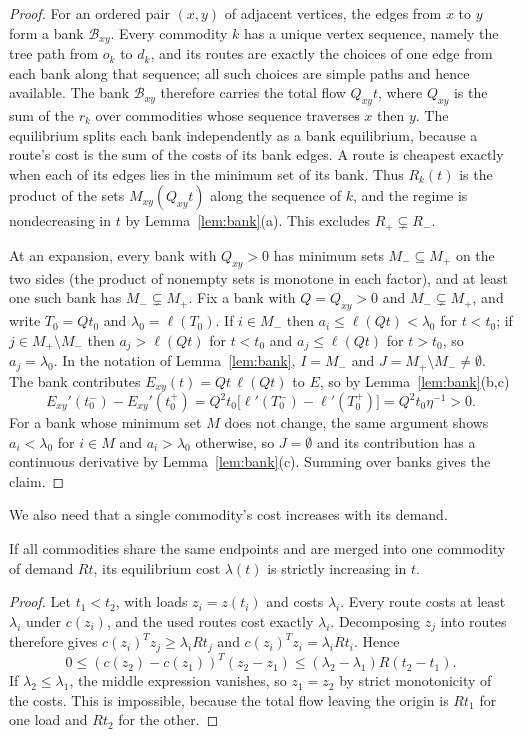 \begin{proof}
For an ordered pair $(x,y)$ of adjacent vertices, the edges from $x$ to $y$
form a bank $\mathcal B_{xy}$. Every commodity $k$ has a unique vertex
sequence, namely the tree path from $o_k$ to $d_k$, and its routes are
exactly the choices of one edge from each bank along that sequence; all such
choices are simple paths and hence available. The bank $\mathcal B_{xy}$
therefore carries the total flow $Q_{xy}t$, where $Q_{xy}$ is the sum of the
$r_k$ over commodities whose sequence traverses $x$ then $y$. The
equilibrium splits each bank independently as a bank equilibrium, because a
route's cost is the sum of the costs of its bank edges. A route is cheapest
exactly when each of its edges lies in the minimum set of its bank. Thus
$R_k(t)$ is the product of the sets $M_{xy}(Q_{xy}t)$ along the sequence of
$k$, and the regime is nondecreasing in $t$ by Lemma~\ref{lem:bank}(a). This
excludes $R_+\subsetneq R_-$.

At an expansion, every bank with $Q_{xy}>0$ has minimum sets $M_-\subseteq
M_+$ on the two sides (the product of nonempty sets is monotone in each
factor), and at least one such bank has $M_-\subsetneq M_+$. Fix a bank with
$Q=Q_{xy}>0$ and $M_-\subsetneq M_+$, and write $T_0=Qt_0$ and
$\lambda_0=\ell(T_0)$. If $i\in M_-$ then $a_i\le\ell(Qt)<\lambda_0$ for
$t<t_0$; if $j\in M_+\setminus M_-$ then $a_j>\ell(Qt)$ for $t<t_0$ and
$a_j\le\ell(Qt)$ for $t>t_0$, so $a_j=\lambda_0$. In the notation of
Lemma~\ref{lem:bank}, $I=M_-$ and $J=M_+\setminus M_-\ne\emptyset$. The bank
contributes $E_{xy}(t)=Qt\,\ell(Qt)$ to $E$, so by Lemma~\ref{lem:bank}(b,c)
\[
 E_{xy}'(t_0^-)-E_{xy}'(t_0^+)=Q^2t_0\bigl[\ell'(T_0^-)-\ell'(T_0^+)\bigr]
 =Q^2t_0\eta^{-1}>0.
\]
For a bank whose minimum set $M$ does not change, the same argument shows
$a_i<\lambda_0$ for $i\in M$ and $a_i>\lambda_0$ otherwise, so $J=\emptyset$
and its contribution has a continuous derivative by
Lemma~\ref{lem:bank}(c). Summing over banks gives the claim.
\end{proof}

We also need that a single commodity's cost increases with its demand.

\begin{lemma}\label{lem:monotone}
If all commodities share the same endpoints and are merged into one
commodity of demand $Rt$, its equilibrium cost $\lambda(t)$ is strictly
increasing in $t$.
\end{lemma}

\begin{proof}
Let $t_1<t_2$, with loads $z_i=z(t_i)$ and costs $\lambda_i$. Every route
costs at least $\lambda_i$ under $c(z_i)$, and the used routes cost exactly
$\lambda_i$. Decomposing $z_j$ into routes therefore gives
$c(z_i)^Tz_j\ge\lambda_iRt_j$ and $c(z_i)^Tz_i=\lambda_iRt_i$. Hence
\[
 0\le(c(z_2)-c(z_1))^T(z_2-z_1)\le(\lambda_2-\lambda_1)R(t_2-t_1).
\]
If $\lambda_2\le\lambda_1$, the middle expression vanishes, so $z_1=z_2$ by
strict monotonicity of the costs. This is impossible, because the total flow
leaving the origin is $Rt_1$ for one load and $Rt_2$ for the other.
\end{proof}

